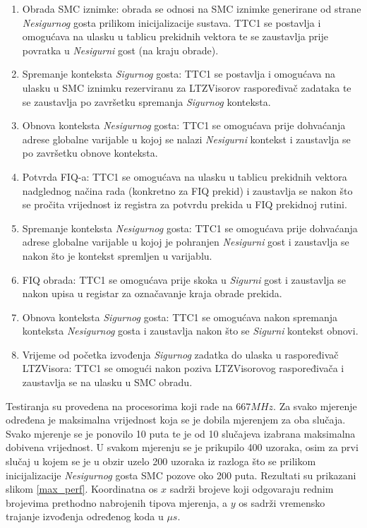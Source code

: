 \documentclass[times, utf8, diplomski, numeric]{fer}
\begin{document}
\begin{enumerate}
  \item{Obrada SMC iznimke: obrada se odnosi na SMC iznimke generirane od strane \textit{Nesigurnog} gosta prilikom
  inicijalizacije sustava. TTC1 se postavlja i omogućava na ulasku u tablicu prekidnih vektora te se zaustavlja prije
  povratka u \textit{Nesigurni} gost (na kraju obrade).}
  \item{Spremanje konteksta \textit{Sigurnog} gosta: TTC1 se postavlja i omogućava na ulasku u SMC iznimku rezerviranu
  za LTZVisorov raspoređivač zadataka te se zaustavlja po završetku spremanja \textit{Sigurnog} konteksta.}
  \item{Obnova konteksta \textit{Nesigurnog} gosta: TTC1 se omogućava prije dohvaćanja adrese globalne varijable u kojoj
  se nalazi \textit{Nesigurni} kontekst i zaustavlja se po završetku obnove konteksta.}
  \item{Potvrda FIQ-a: TTC1 se omogućava na ulasku u tablicu prekidnih vektora nadglednog načina rada (konkretno za
  FIQ prekid) i zaustavlja se nakon što se pročita vrijednost iz registra za potvrdu prekida u FIQ prekidnoj rutini.}
  \item{Spremanje konteksta \textit{Nesigurnog} gosta: TTC1 se omogućava prije dohvaćanja adrese globalne varijable u kojoj
  je pohranjen \textit{Nesigurni} gost i zaustavlja se nakon što je kontekst spremljen u varijablu.}
  \item{FIQ obrada: TTC1 se omogućava prije skoka u \textit{Sigurni} gost i zaustavlja se nakon upisa u registar za
  označavanje kraja obrade prekida.}
  \item{Obnova konteksta \textit{Sigurnog} gosta: TTC1 se omogućava nakon spremanja konteksta \textit{Nesigurnog} gosta
  i zaustavlja nakon što se \textit{Sigurni} kontekst obnovi.}
  \item{Vrijeme od početka izvođenja \textit{Sigurnog} zadatka do ulaska u raspoređivač LTZVisora: TTC1 se omogući
  nakon poziva LTZVisorovog raspoređivača i zaustavlja se na ulasku u SMC obradu.}
\end{enumerate}
Testiranja su provedena na procesorima koji rade na $667 MHz$. Za svako mjerenje određena je maksimalna vrijednost
koja se je dobila mjerenjem za oba slučaja. Svako mjerenje se je ponovilo 10 puta te je od 10 slučajeva izabrana
maksimalna dobivena vrijednost. U svakom mjerenju se je prikupilo 400 uzoraka, osim za prvi slučaj u kojem se je u
obzir uzelo 200 uzoraka iz razloga što se prilikom inicijalizacije \textit{Nesigurnog} gosta SMC pozove oko 200 puta.
Rezultati su prikazani slikom \ref{max_perf}. Koordinatna
os $x$ sadrži brojeve koji odgovaraju rednim brojevima prethodno nabrojenih tipova mjerenja, a $y$ os sadrži vremensko
trajanje izvođenja određenog koda u $\mu s$.
\end{document}
